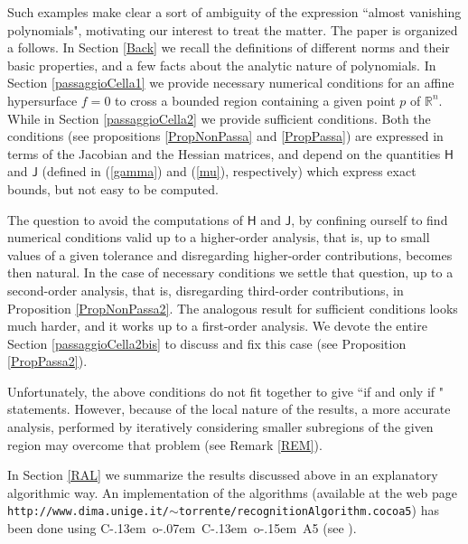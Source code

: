 \documentclass[10pt]{article}
\newcommand\R{{\mathbb R}}
\def\cocoa{{\hbox{\rm C\kern-.13em o\kern-.07em C\kern-.13em o\kern-.15em A}}}
\begin{document}
\smallskip
Such examples make clear a sort of ambiguity of the expression ``almost vanishing polynomials", motivating our interest to treat   the matter. The paper is organized a follows.
In Section \ref{Back} we recall the definitions of different norms and their basic properties, and a few facts about the analytic nature of polynomials.
In Section \ref{passaggioCella1} we provide necessary  numerical conditions for an affine  hypersurface $f=0$ to cross   a  bounded region containing a given  point $p$ of $\R^n$. While in Section \ref{passaggioCella2}  we provide sufficient conditions. Both the conditions (see propositions \ref{PropNonPassa} and \ref{PropPassa}) are expressed in terms of the Jacobian and the Hessian matrices, and depend on the quantities $\mathsf H$ and $\mathsf J$ (defined  in  (\ref{gamma}) and (\ref{mu}), respectively) which express exact bounds, but  not easy to be computed. 

The question to avoid the computations of $\mathsf H$ and $\mathsf J$,  by  confining ourself to find numerical conditions valid  up to a higher-order analysis, that is, up to small values of a given tolerance and disregarding higher-order contributions, becomes then natural. 
 In the case of necessary conditions we
  settle that question, up to a second-order analysis, that is, disregarding third-order contributions,
   in Proposition \ref{PropNonPassa2}.
The analogous result  for sufficient conditions  looks much harder, and it works up to a first-order analysis.   We devote the entire  Section \ref{passaggioCella2bis}   to discuss and fix this case (see Proposition \ref{PropPassa2}).

 Unfortunately, the above conditions do not fit together to give   ``if and only if " statements. However,  because of the local nature of the  results, a more accurate analysis, performed  by iteratively considering smaller subregions  of the given region 
may overcome that problem (see Remark \ref{REM}).

In Section \ref{RAL} we   summarize the results discussed above in an explanatory  algorithmic way. An implementation of the  algorithms (available at the web page {\tt http://www.dima.unige.it/$\sim$torrente/recognitionAlgorithm.cocoa5}) has been done using \cocoa 5 (see \cite{Cocoa}).
\end{document}
